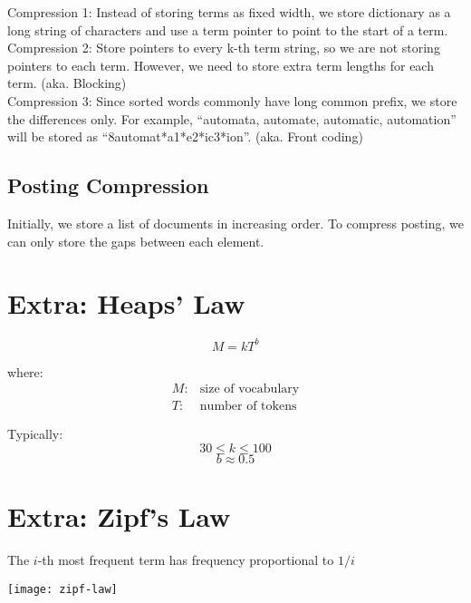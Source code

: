 \begin{multicols*}{2}
\noindent Compression 1: Instead of storing terms as fixed width, we store dictionary as a long string of characters and use a term pointer to point to the start of a term.\\

\noindent Compression 2: Store pointers to every k-th term string, so we are not storing pointers to each term. However, we need to store extra term lengths for each term. (aka. Blocking)\\

\noindent Compression 3: Since sorted words commonly have long common prefix, we store the differences only. For example, ``automata, automate, automatic, automation'' will be stored as ``8automat*a1*e2*ic3*ion''. (aka. Front coding)

\subsection{Posting Compression}
Initially, we store a list of documents in increasing order. To compress posting, we can only store the gaps between each element. 

\section{Extra: Heaps’ Law}
$$M=kT^b$$

\noindent where:
\begin{equation*}
\begin{split}
    M: & \text{size of vocabulary} \\
    T: & \text{number of tokens}
\end{split}
\end{equation*}

\noindent Typically: 
$$30 \le k \le 100$$
$$b \approx 0.5$$

\section{Extra: Zipf’s Law}
The $i$-th most frequent term has frequency proportional to $1 / i$
\begin{center}
\texttt{[image: zipf-law]}
\end{center}

\end{multicols*}
